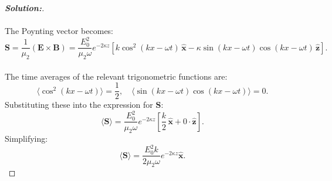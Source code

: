 \documentclass[12pt]{article}
\theoremstyle{definition}\newtheorem{problem}{Problem}
\newenvironment{solution}{\begin{proof}[\bfseries\textup{Solution:}]}{\end{proof}}
\begin{document}
\begin{solution}
\paragraph{}  
The Poynting vector becomes:
\[
\mathbf{S} = \frac{1}{\mu_2} (\mathbf{E} \times \mathbf{B}) = \frac{E_0^2}{\mu_2 \omega} e^{-2\kappa z} \left[ k \cos^2(kx - \omega t)\,\hat{\mathbf{x}} - \kappa \sin(kx - \omega t) \cos(kx - \omega t)\,\hat{\mathbf{z}} \right].
\]

\paragraph{}
The time averages of the relevant trigonometric functions are:
\[
\langle \cos^2(kx - \omega t) \rangle = \frac{1}{2}, \quad \langle \sin(kx - \omega t) \cos(kx - \omega t) \rangle = 0.
\]
Substituting these into the expression for \(\mathbf{S}\):
\[
\langle \mathbf{S} \rangle = \frac{E_0^2}{\mu_2 \omega} e^{-2\kappa z} \left[ \frac{k}{2}\,\hat{\mathbf{x}} + 0 \cdot \hat{\mathbf{z}} \right].
\]
Simplifying:
\[
\langle \mathbf{S} \rangle = \frac{E_0^2 k}{2 \mu_2 \omega} e^{-2\kappa z} \hat{\mathbf{x}}.
\]


\end{solution}
\end{document}
